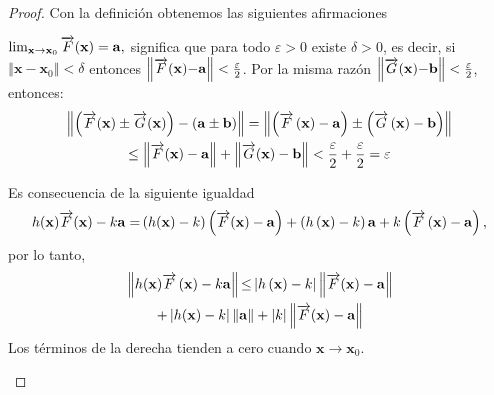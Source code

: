 \begin{proof}
  Con la definición obtenemos las siguientes afirmaciones
  \begin{parrafonumerado}
  \item $\lim_{\mathbf{x\to x}_{0}}\overrightarrow{F}(\mathbf{x}) =\mathbf{a,}$
    significa que para todo $\varepsilon >0$ existe $\delta >0$,
    es decir, si $\left\Vert \mathbf{x-x}_{0}\right\Vert <\delta $ entonces
    $\left\Vert \overrightarrow{F}(\mathbf{x}) \mathbf{-a}\right\Vert <\frac{\varepsilon }{2}$.
    Por la misma razón
    $\left\Vert \overrightarrow{G}(\mathbf{x}) \mathbf{-b}\right\Vert <\frac{\varepsilon }{2}$,
    entonces:
    \begin{multline*}
      \left\Vert \left( \overrightarrow{F}(\mathbf{x}) \pm \overrightarrow{G}(\mathbf{x}) \right) -\left( \mathbf{a\pm b}
      \right) \right\Vert = \left\Vert \left( \overrightarrow{F}\left( \mathbf{x} \right) -\mathbf{a}\right) \pm \left( \overrightarrow{G}\left( \mathbf{x} \right) -\mathbf{b}\right) \right\Vert \\
      \leq \left\Vert \overrightarrow{F} (\mathbf{x}) -\mathbf{a}\right\Vert +\left\Vert \overrightarrow{G}(\mathbf{x}) -\mathbf{b}\right\Vert <\frac{\varepsilon }{2}+\frac{\varepsilon }{2}= \varepsilon
    \end{multline*}

  \item Es consecuencia de la siguiente igualdad
    $$h(\mathbf{x}) \ve{F}(\mathbf{x}) -k \mathbf{a=}\left( h(\mathbf{x}) -k\right) \left( \ve{%
    F}(\mathbf{x}) -\mathbf{a}\right) +\left( h\left( \mathbf{x} \right) -k\right) \mathbf{a}+k\left( \ve{F}\left( \mathbf{x} \right) -\mathbf{a}\right),$$
    por lo tanto,
    \begin{multline*}
      \left\Vert h(\mathbf{x}) \overrightarrow{F}\left( \mathbf{x}\right) -k\mathbf{a}\right\Vert \mathbf{\leq }\left\vert h\left( \mathbf{x} \right) -k\right\vert \left\Vert \overrightarrow{F}(\mathbf{x}) - \mathbf{a}\right\Vert \\ +\left\vert h(\mathbf{x}) -k\right\vert \left\Vert \mathbf{a}\right\Vert +\left\vert k\right\vert \left\Vert \overrightarrow{F}(\mathbf{x}) -\mathbf{a}\right\Vert
    \end{multline*}
    Los términos de la derecha tienden a cero cuando $\mathbf{x}\to \mathbf{x}_{0}$.


\end{parrafonumerado}
\end{proof}
